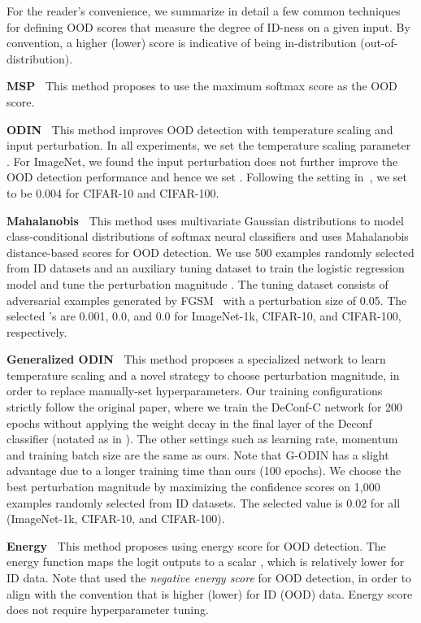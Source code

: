 \documentclass[runningheads]{llncs}
\begin{document}
For the reader's convenience, we summarize in detail a few common techniques for defining OOD scores that measure the degree of ID-ness on a given input.
By convention, a higher (lower) score is indicative of being in-distribution (out-of-distribution).

\noindent \textbf{MSP~\cite{Kevin}} This method proposes to use the maximum softmax score as the OOD score.


\noindent \textbf{ODIN~\cite{liang2018enhancing}} This method improves OOD detection with temperature scaling and input perturbation. In all experiments, we set the temperature scaling parameter . 
For ImageNet, we found the input perturbation does not further improve the OOD detection performance and hence we set . 
Following the setting in~\cite{liang2018enhancing}, we set  to be 0.004 for CIFAR-10 and CIFAR-100.

\noindent \textbf{Mahalanobis~\cite{lee2018simple}}  This method uses multivariate Gaussian distributions to model class-conditional distributions of softmax neural classifiers and uses Mahalanobis distance-based scores for OOD detection. We use 500 examples randomly selected from ID datasets and an auxiliary tuning dataset to train the logistic regression model and tune the perturbation magnitude . The tuning dataset consists of adversarial examples generated by FGSM~\cite{goodfellow2014explaining} with a perturbation size of 0.05.\@
The selected 's are 0.001, 0.0, and 0.0 for ImageNet-1k, CIFAR-10, and CIFAR-100, respectively.

\noindent \textbf{Generalized ODIN~\cite{godin2020CVPR}}  This method proposes a specialized network to learn temperature scaling and a novel strategy to choose perturbation magnitude, in order to replace manually-set hyperparameters. Our training configurations strictly follow the original paper, where we train the DeConf-C network for 200 epochs without applying the weight decay in the final layer of the Deconf classifier (notated as  in \cite{godin2020CVPR}). The other settings such as learning rate, momentum and training batch size are the same as ours. Note that  G-ODIN has a slight advantage due to a longer training time than ours (100 epochs). We choose the best perturbation magnitude  by maximizing the confidence scores on 1,000 examples randomly selected from ID datasets. The selected  value is 0.02 for all (ImageNet-1k, CIFAR-10, and CIFAR-100).

\noindent \textbf{Energy~\cite{liu2020energy}}  This method proposes using energy score for OOD detection. The energy function  maps the logit outputs to a scalar , which is relatively lower for ID data.\@
Note that \cite{liu2020energy} used the \emph{negative energy score} for OOD detection, in order to align with the convention that  is higher (lower) for ID (OOD) data. Energy score does not require hyperparameter tuning. 
\end{document}
